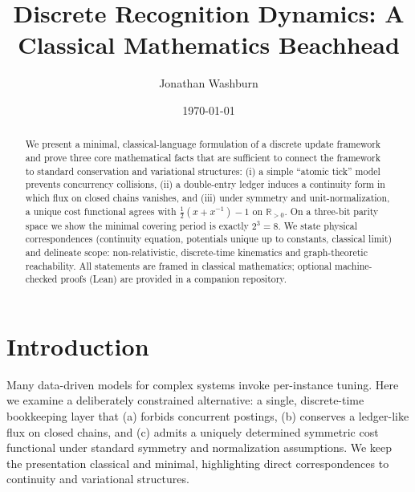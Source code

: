 \documentclass[11pt,letterpaper]{article}
\title{Discrete Recognition Dynamics: A Classical Mathematics Beachhead}
\author{Jonathan Washburn}
\date{\today}
\begin{document}
\maketitle
\begin{abstract}
We present a minimal, classical-language formulation of a discrete update framework and prove three core mathematical facts that are sufficient to connect the framework to standard conservation and variational structures: (i) a simple ``atomic tick'' model prevents concurrency collisions, (ii) a double-entry ledger induces a continuity form in which flux on closed chains vanishes, and (iii) under symmetry and unit-normalization, a unique cost functional agrees with $\tfrac12(x+x^{-1})-1$ on $\mathbb R_{>0}$. On a three-bit parity space we show the minimal covering period is exactly $2^3=8$. We state physical correspondences (continuity equation, potentials unique up to constants, classical limit) and delineate scope: non-relativistic, discrete-time kinematics and graph-theoretic reachability. All statements are framed in classical mathematics; optional machine-checked proofs (Lean) are provided in a companion repository.\end{abstract}

\section{Introduction}
Many data-driven models for complex systems invoke per-instance tuning. Here we examine a deliberately constrained alternative: a single, discrete-time bookkeeping layer that (a) forbids concurrent postings, (b) conserves a ledger-like flux on closed chains, and (c) admits a uniquely determined symmetric cost functional under standard symmetry and normalization assumptions. We keep the presentation classical and minimal, highlighting direct correspondences to continuity and variational structures.
\end{document}
